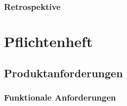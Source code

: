 \documentclass[a4paper, 11pt]{scrreprt}
\begin{document}
\subsection{Retrospektive}

\chapter{Pflichtenheft}

\section{Produktanforderungen}

\subsection{Funktionale Anforderungen}
\end{document}
